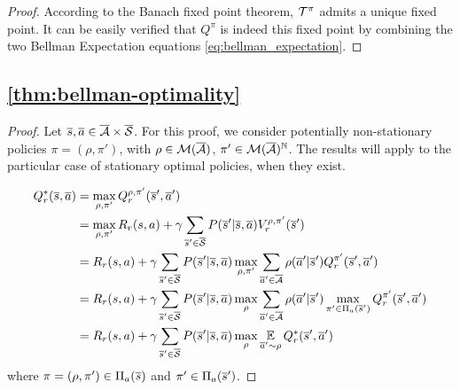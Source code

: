 \begin{subappendices}
\begin{proof}
	According to the Banach fixed point theorem, $\mathcal{T}^\pi$ admits a unique fixed point.
	It can be easily verified that $Q^\pi$ is indeed this fixed point by combining the two Bellman Expectation equations \eqref{eq:bellman_expectation}.
	
\end{proof}

\subsection{\autoref{thm:bellman-optimality}}

\begin{proof}
	Let $\overline{s}, \overline{a} \in \overline{\mathcal{A}}\times\overline{\mathcal{S}}$. For this proof, we consider  potentially non-stationary policies $\pi=(\rho, \pi')$, with $\rho\in\mathcal{M}(\overline{\mathcal{A}})$, $\pi'\in\mathcal{M}(\overline{\mathcal{A}})^{\mathbb{N}}$. The results will apply to the particular case of stationary optimal policies, when they exist.
	
	\begin{align}
	Q_r^*(\overline{s}, \overline{a}) &=  \max_{\rho, \pi'} Q_r^{\rho, \pi'}(\overline{s}', \overline{a}') \label{eq:pthm_def}\\
	&= \max_{\rho, \pi'} R_r(s, a) + \gamma \sum_{\overline{s}'\in\overline{\mathcal{S}}} P(\overline{s}' | \overline{s}, \overline{a}) V_r^{\rho, \pi'}(\overline{s}') \label{eq:pthm_exp}\\
	&= R_r(s, a) + \gamma \sum_{\overline{s}'\in\overline{\mathcal{S}}}  P(\overline{s}' | \overline{s}, \overline{a}) \max_{\rho, \pi'} \sum_{\overline{a}'\in\overline{\mathcal{A}}} \rho(\overline{a}' | \overline{s}')Q_r^{\pi'}(\overline{s}', \overline{a}') \label{eq:pthm_marg}\\
	&= R_r(s, a) + \gamma \sum_{\overline{s}'\in\overline{\mathcal{S}}}  P(\overline{s}' | \overline{s}, \overline{a}) \max_\rho\sum_{\overline{a}'\in\overline{\mathcal{A}}}\rho(\overline{a}' | \overline{s}')\max_{\pi'\in\Pi_a(\overline{s}')}Q_r^{\pi'}(\overline{s}', \overline{a}') \label{eq:pthm_max}\\
	&= R_r(s, a) + \gamma \sum_{\overline{s}'\in\overline{\mathcal{S}}}  P(\overline{s}' | \overline{s}, \overline{a}) \max_\rho\operatorname*{\mathbb{E}}\limits_{\overline{a}'\sim\rho}Q_r^*(\overline{s}', \overline{a}') \label{eq:pthm_marg_def2}
	\end{align}
	where $\pi = (\rho, \pi')\in\Pi_a(\overline{s})$ and $\pi'\in\Pi_a(\overline{s}')$.
	

\end{proof}
\end{subappendices}
